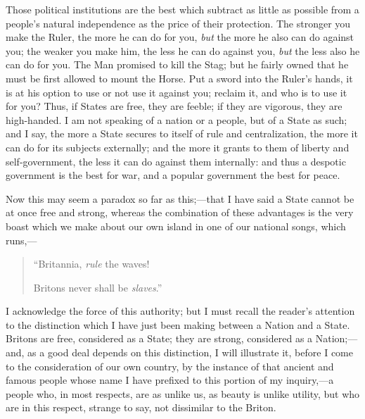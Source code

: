 Those political institutions are the best which
subtract as little as possible from a people's natural independence as
the price of their protection. The stronger you make the Ruler, the
more he can do for you, \emph{but} the more he also can do against
you; the weaker you make him, the less he can do against you, \emph{but}
the less also he can do for you. The Man promised to kill the Stag;
but he fairly owned that he must be first allowed to mount the Horse.
Put a sword into the Ruler's hands, it is at his option to use
or not use it against you; reclaim it, and who is to use it for you?
Thus, if States are free, they are feeble; if they are vigorous, they
are high-handed. I am not speaking of a nation or a people, but of a
State as such; and I say, the more a State secures to itself of rule
and centralization, the more it can do for its subjects externally;
and the more it grants to them of liberty and self-government, the
less it can do against them internally: and thus a despotic government
is the best for war, and a popular government the best for peace.

Now this may seem a paradox so far as
this;—that I have said a State cannot be at once free and strong,
whereas the combination of these advantages is the very boast which we
make about our own island in one of our national songs, which runs,—

\begin{quote}

``Britannia, \emph{rule} the waves!

Britons never shall be \emph{slaves}.''

\end{quote}

I acknowledge the force of this authority; but I
must recall the reader's attention to the distinction which I have
just been making between a Nation and a State. Britons are free,
considered as a State; they are strong, considered as a Nation;—and,
as a good deal depends on this distinction, I will illustrate it,
before I come to the consideration of our own country, by the instance
of that ancient and famous people whose name I have prefixed to this
portion of my inquiry,—a people who, in most respects, are as unlike
us, as beauty is unlike utility, but who are in this respect, strange
to say, not dissimilar to the Briton.

